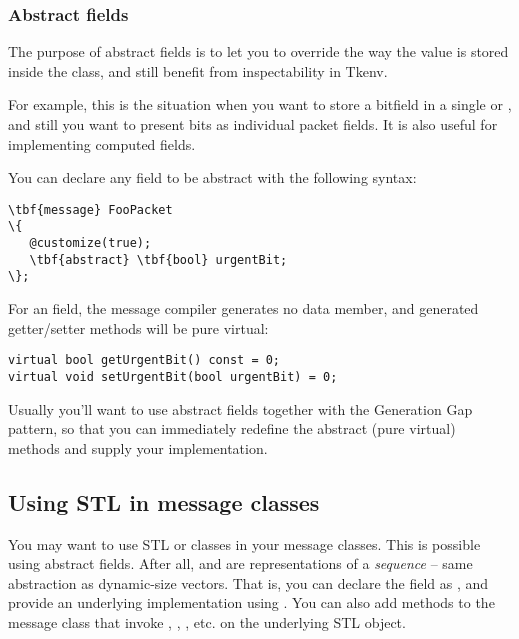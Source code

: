 \subsubsection{Abstract fields}

The purpose of abstract fields is to let you to override
the way the value is stored inside the class,
and still benefit from inspectability in Tkenv.

For example, this is the situation when you want to store a bitfield
in a single  or , and still you want
to present bits as individual packet fields.
It is also useful for implementing computed fields.

You can declare any field to be abstract with the following syntax:

\begin{Verbatim}[commandchars=\\\{\}]
\tbf{message} FooPacket
\{
   @customize(true);
   \tbf{abstract} \tbf{bool} urgentBit;
\};
\end{Verbatim}

For an  field, the message compiler generates
no data member, and generated getter/setter methods will be pure
virtual:

\begin{verbatim}
virtual bool getUrgentBit() const = 0;
virtual void setUrgentBit(bool urgentBit) = 0;
\end{verbatim}


Usually you'll want to use abstract fields together with
the Generation Gap pattern, so that you can immediately
redefine the abstract (pure virtual) methods and
supply your implementation.



\subsection{Using STL in message classes}







You may want to use STL  or  classes in your message classes.
This is possible using abstract fields. After all,  and 
are representations of a \textit{sequence} -- same abstraction as dynamic-size vectors.
That is, you can declare the field as , and provide
an underlying implementation using . You can also add methods
to the message class that invoke , , , etc.
on the underlying STL object.

